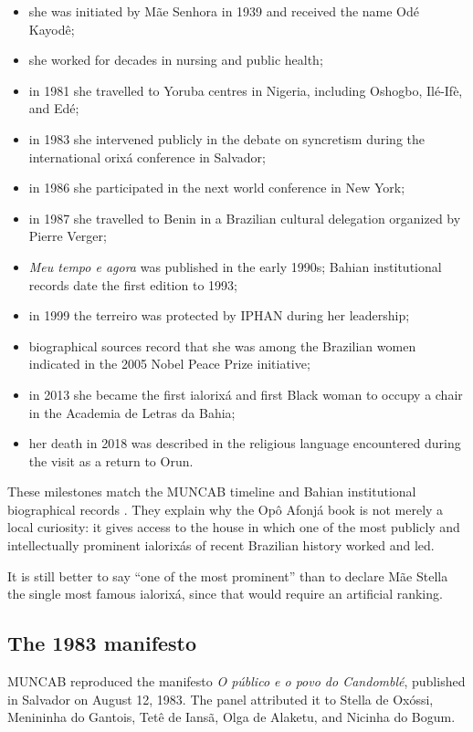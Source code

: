 \begin{itemize}
\item she was initiated by M\~ae Senhora in
1939 and received the name Od\'e Kayod\^e;
\item she worked for decades in nursing and
public health;
\item in 1981 she travelled to Yoruba
centres in Nigeria, including Oshogbo,
Il\'e-If\`e, and Ed\'e;
\item in 1983 she intervened publicly in
the debate on syncretism during the
international orix\'a conference in
Salvador;
\item in 1986 she participated in the next
world conference in New York;
\item in 1987 she travelled to Benin in a
Brazilian cultural delegation organized by
Pierre Verger;
\item \emph{Meu tempo e agora} was
published in the early 1990s; Bahian
institutional records date the first
edition to 1993;
\item in 1999 the terreiro was protected by
IPHAN during her leadership;
\item biographical sources record that she
was among the Brazilian women indicated in
the 2005 Nobel Peace Prize initiative;
\item in 2013 she became the first
ialorix\'a and first Black woman to occupy
a chair in the Academia de Letras da Bahia;
\item her death in 2018 was described in
the religious language encountered during
the visit as a return to Orun.
\end{itemize}

These milestones match the MUNCAB timeline
and Bahian institutional biographical
records \cite{alba-mae-stella,mae-stella-alb}.
They explain why the Op\^o Afonj\'a book is
not merely a local curiosity: it gives
access to the house in which one of the
most publicly and intellectually prominent
ialorix\'as of recent Brazilian history
worked and led.

It is still better to say ``one of the most
prominent'' than to declare M\~ae Stella
the single most famous ialorix\'a, since
that would require an artificial ranking.

\subsection{The 1983 manifesto}
\label{religion-section-manifesto-1983}

MUNCAB reproduced the manifesto
\emph{O p\'ublico e o povo do Candombl\'e},
published in Salvador on August 12, 1983.
The panel attributed it to Stella de
Ox\'ossi, Menininha do Gantois, Tet\^e de
Ians\~a, Olga de Alaketu, and Nicinha do
Bogum.

